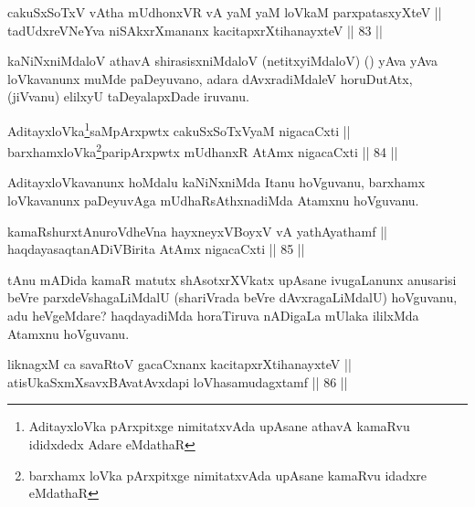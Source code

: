 
\begin{shl}
cakuSxSoTxV vA\s tha mUdhonxVR vA yaM yaM loVkaM parxpatasxyXteV || \\
tadUdxreVNeYva niSAkxrXmananx kacitapxrXtihanayxteV \hfill || 83 ||  
\end{shl}

\begin{artha}
kaNiNxniMdaloV athavA shirasisxniMdaloV (netitxyiMdaloV) (\quad) yAva
yAva loVkavanunx muMde paDeyuvano, adara dAvxradiMdaleV horuDutAtx,
(jiVvanu) elilxyU taDeyalapxDade iruvanu.
\end{artha}


\begin{shl}
AditayxloVka\footnote{AditayxloVka pArxpitxge nimitatxvAda upAsane athavA kamaRvu ididxdedx Adare eMdathaR}saMpArxpwtx cakuSxSoTxV\s yaM nigacaCxti || \\
barxhamxloVka\footnote{barxhamx loVka pArxpitxge nimitatxvAda upAsane kamaRvu idadxre eMdathaR}paripArxpwtx mUdhanxR AtAmx nigacaCxti \hfill || 84 ||  
\end{shl}


\begin{artha}
AditayxloVkavanunx hoMdalu kaNiNxniMda Itanu
hoVguvanu, barxhamx loVkavanunx paDeyuvAga mUdhaRsAthxnadiMda Atamxnu
hoVguvanu.
\end{artha}


	
\begin{shl}
kamaRshurxtAnuroVdheVna hayxneyxVBoyxV vA yathAyathamf || \\
haqdayasaqtanADiVBirita AtAmx nigacaCxti \hfill || 85 ||   
\end{shl}

\begin{artha}
tAnu mADida kamaR matutx shAsotxrXVkatx upAsane ivugaLanunx anusarisi
beVre parxdeVshagaLiMdalU (shariVrada beVre dAvxragaLiMdalU)
hoVguvanu, adu heVgeMdare? haqdayadiMda horaTiruva nADigaLa mUlaka
ililxMda Atamxnu hoVguvanu.
\end{artha}


\begin{shl}
liknagxM ca savaRtoV gacaCxnanx kacitapxrXtihanayxteV || \\
atisUkaSxmXsavxBAvatAvxdapi loVhasamudagxtamf \hfill || 86 ||  
\end{shl}

